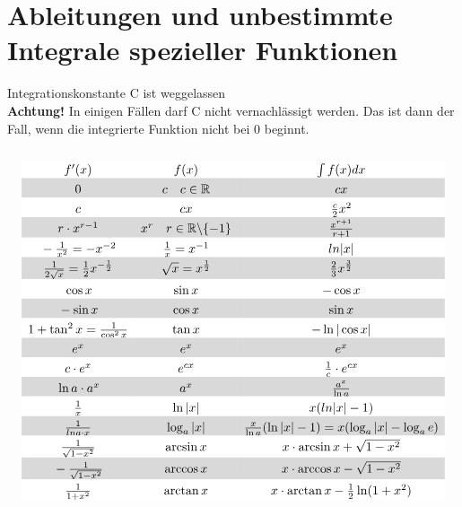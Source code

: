 \section{Ableitungen und unbestimmte Integrale spezieller Funktionen}
\label{sec:ablintspez}
Integrationskonstante C ist weggelassen\\
\textbf{Achtung!} In einigen Fällen darf C nicht vernachlässigt werden. 
Das ist dann der Fall, wenn die integrierte Funktion nicht bei 0 beginnt. \\\\
\footnotesize
\[ \begin{matrix}
\rowcolor{white} f'(x) & f(x) & \int f(x) dx\\
\rowcolor{lgray} \rule{0pt}{12pt}0 & c \quad c \in \mathbb{R} & cx \\
\rowcolor{white} \rule{0pt}{12pt}c & cx & \frac{c}{2}x^2 \\
\rowcolor{lgray} \rule{0pt}{12pt}r \cdot x^{r-1} & x^r 
\quad r \in \mathbb{R} \backslash \{-1\} & \frac{x^{r+1}}{r+1} \\
\rowcolor{white} \rule{0pt}{12pt}-\frac{1}{x^2} = -x^{-2} 
& \frac{1}{x} = x^{-1} & ln{|x|} \\
\rowcolor{lgray} \rule{0pt}{12pt}\frac{1}{2\sqrt{x}} 
= \frac{1}{2}x^{-\frac{1}{2}} & \sqrt{x} = x^{\frac{1}{2}} 
& \frac{2}{3}x^{\frac{3}{2}} \\
\rowcolor{white} \rule{0pt}{12pt}\cos x & \sin x & -\cos x \\
\rowcolor{lgray} \rule{0pt}{12pt}-\sin x & \cos x & \sin x \\
\rowcolor{white} \rule{0pt}{12pt}1 + \tan^2 x = \frac{1}{\cos^2 x} & \tan x 
& -\ln |\cos x| \\
\rowcolor{lgray} \rule{0pt}{12pt}e^x & e^x & e^x \\
\rowcolor{white} \rule{0pt}{12pt}c \cdot e^x & e^{cx} 
& \frac{1}{c} \cdot e^{cx} \\
\rowcolor{lgray} \rule{0pt}{12pt}\ln a \cdot a^x & a^x & \frac{a^x}{\ln a} \\
\rowcolor{white} \rule{0pt}{12pt}\frac{1}{x} & \ln |x| & x(ln |x| - 1) \\
\rowcolor{lgray} \rule{0pt}{12pt}\frac{1}{ln a \cdot x} & \log_a |x| 
& \frac{x}{\ln a}(\ln |x| - 1) = x(\log_a |x| - \log_a e) \\
\rowcolor{white} \rule{0pt}{12pt}\frac{1}{\sqrt{1 - x^2}} & \arcsin x 
& x \cdot \arcsin x + \sqrt{1 - x^2} \\
\rowcolor{lgray} \rule{0pt}{12pt}-\frac{1}{\sqrt{1 - x^2}} & \arccos x 
& x \cdot \arccos x - \sqrt{1 - x^2} \\
\rowcolor{white} \rule{0pt}{12pt}\frac{1}{1 + x^2} & \arctan x 
& x \cdot \arctan x - \frac{1}{2}\ln(1 + x^2) \\
\end{matrix} \]
\normalsize
